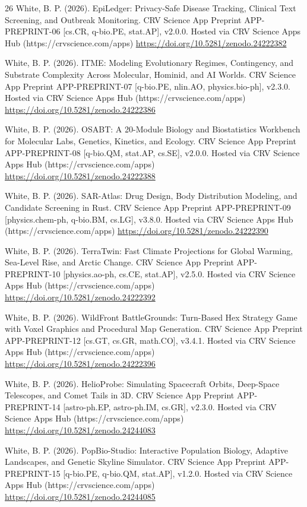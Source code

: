 \documentclass[10pt,letterpaper]{article}
\begin{document}
\begin{thebibliography}{26}
 White, B. P. (2026). EpiLedger: Privacy-Safe Disease Tracking, Clinical Text Screening, and Outbreak Monitoring. CRV Science App Preprint APP-PREPRINT-06 [cs.CR, q-bio.PE, stat.AP], v2.0.0. Hosted via CRV Science Apps Hub (https://crvscience.com/apps) \url{https://doi.org/10.5281/zenodo.24222382}

 White, B. P. (2026). ITME: Modeling Evolutionary Regimes, Contingency, and Substrate Complexity Across Molecular, Hominid, and AI Worlds. CRV Science App Preprint APP-PREPRINT-07 [q-bio.PE, nlin.AO, physics.bio-ph], v2.3.0. Hosted via CRV Science Apps Hub (https://crvscience.com/apps) \url{https://doi.org/10.5281/zenodo.24222386}

 White, B. P. (2026). OSABT: A 20-Module Biology and Biostatistics Workbench for Molecular Labs, Genetics, Kinetics, and Ecology. CRV Science App Preprint APP-PREPRINT-08 [q-bio.QM, stat.AP, cs.SE], v2.0.0. Hosted via CRV Science Apps Hub (https://crvscience.com/apps) \url{https://doi.org/10.5281/zenodo.24222388}

 White, B. P. (2026). SAR-Atlas: Drug Design, Body Distribution Modeling, and Candidate Screening in Rust. CRV Science App Preprint APP-PREPRINT-09 [physics.chem-ph, q-bio.BM, cs.LG], v3.8.0. Hosted via CRV Science Apps Hub (https://crvscience.com/apps) \url{https://doi.org/10.5281/zenodo.24222390}

 White, B. P. (2026). TerraTwin: Fast Climate Projections for Global Warming, Sea-Level Rise, and Arctic Change. CRV Science App Preprint APP-PREPRINT-10 [physics.ao-ph, cs.CE, stat.AP], v2.5.0. Hosted via CRV Science Apps Hub (https://crvscience.com/apps) \url{https://doi.org/10.5281/zenodo.24222392}

 White, B. P. (2026). WildFront BattleGrounds: Turn-Based Hex Strategy Game with Voxel Graphics and Procedural Map Generation. CRV Science App Preprint APP-PREPRINT-12 [cs.GT, cs.GR, math.CO], v3.4.1. Hosted via CRV Science Apps Hub (https://crvscience.com/apps) \url{https://doi.org/10.5281/zenodo.24222396}

 White, B. P. (2026). HelioProbe: Simulating Spacecraft Orbits, Deep-Space Telescopes, and Comet Tails in 3D. CRV Science App Preprint APP-PREPRINT-14 [astro-ph.EP, astro-ph.IM, cs.GR], v2.3.0. Hosted via CRV Science Apps Hub (https://crvscience.com/apps) \url{https://doi.org/10.5281/zenodo.24244083}

 White, B. P. (2026). PopBio-Studio: Interactive Population Biology, Adaptive Landscapes, and Genetic Skyline Simulator. CRV Science App Preprint APP-PREPRINT-15 [q-bio.PE, q-bio.QM, stat.AP], v1.2.0. Hosted via CRV Science Apps Hub (https://crvscience.com/apps) \url{https://doi.org/10.5281/zenodo.24244085}


\end{thebibliography}
\end{document}
